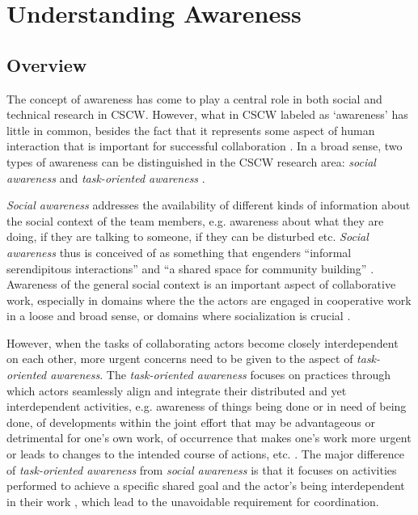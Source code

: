 \graphicspath{{Figures/}}
\chapter{Understanding Awareness} %
\label{cha:understanding_awareness}

\section{Overview} %
\label{sec:overview}

The concept of awareness has come to play a central role in both social and technical research in CSCW. However, what in CSCW labeled as `awareness' has little in common, besides the fact that it represents some aspect of human interaction that is important for successful collaboration \cite{schmidt2002a}. In a broad sense, two types of awareness can be distinguished in the CSCW research area: \emph{social awareness} and \emph{task-oriented awareness} \cite{prinz1999a,schmidt2002a}.

\emph{Social awareness} addresses the availability of different kinds of information about the social context of the team members, e.g. awareness about what they are doing, if they are talking to someone, if they can be disturbed etc. \emph{Social awareness} thus is conceived of as something that engenders ``informal serendipitous interactions'' \cite{hudson1996a} and ``a shared space for community building'' \cite{Dourish1992}. Awareness of the general social context is an important aspect of collaborative work, especially in domains where the the actors are engaged in cooperative work in a loose and broad sense, or domains where socialization is crucial \cite{schmidt2002a}.

However, when the tasks of collaborating actors become closely interdependent on each other, more urgent concerns need to be given to the aspect of \emph{task-oriented awareness}. The \emph{task-oriented awareness} focuses on practices through which actors seamlessly align and integrate their distributed and yet interdependent activities, e.g. awareness of things being done or in need of being done, of developments within the joint effort that may be advantageous or detrimental for one’s own work, of occurrence that makes one’s work more urgent or leads to changes to the intended course of actions, etc. \cite{schmidt2002a}. The major difference of \emph{task-oriented awareness} from \emph{social awareness} is that it focuses on activities performed to achieve a specific shared goal \cite{carroll2003a} and the actor’s being interdependent in their work \cite{schmidt2002a}, which lead to the unavoidable requirement for coordination.

